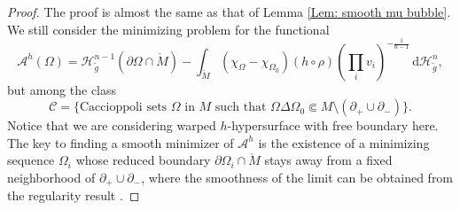 \documentclass[11pt,letterpaper]{amsart}
\numberwithin{equation}{section}
\theoremstyle{definition}
\begin{document}
\begin{proof}
The proof is almost the same as that of Lemma \ref{Lem: smooth mu bubble}. {We still consider the minimizing problem for the functional
$$
\mathcal A^h(\Omega)=\mathcal H^{n-1}_{\tilde g}(\partial\Omega \cap \mathring M)-\int_{\mathring M}(\chi_\Omega-\chi_{\Omega_0})(h\circ \rho)\left(\prod_i v_i\right)^{-\frac{1}{n-1}}\,\mathrm d\mathcal H^n_{\tilde g},
$$
but among the class
$$
\mathcal C=\{\text{Caccioppoli sets $\Omega$ in $M$ such that $\Omega\Delta \Omega_0\Subset  M\setminus(\partial_+\cup\partial_-)$}\}.
$$
Notice that we are considering warped $h$-hypersurface with free boundary here.}  The key to finding a smooth minimizer of $\mathcal A^h$ is the existence of a minimizing sequence $\Omega_i$ whose reduced boundary $\partial\Omega_i\cap \mathring M$ stays away from a fixed neighborhood of $\partial_+\cup\partial_-$, {where the smoothness of the limit can be obtained from the regularity result \cite[Theorem 2.1]{SWZ24}.}


\end{proof}
\end{document}
